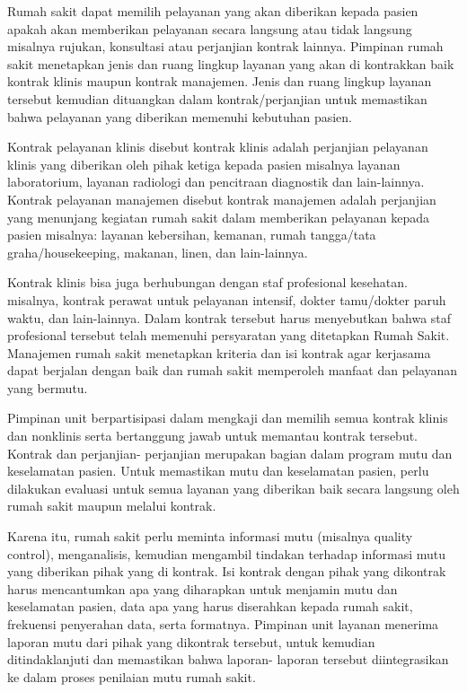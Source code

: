 \documentclass[
]{book}
\begin{document}
Rumah sakit dapat memilih pelayanan yang akan diberikan kepada pasien apakah akan memberikan pelayanan secara langsung atau tidak langsung misalnya rujukan, konsultasi atau perjanjian kontrak lainnya. Pimpinan rumah sakit menetapkan jenis dan ruang lingkup layanan yang akan di kontrakkan baik kontrak klinis maupun kontrak manajemen. Jenis dan ruang lingkup layanan tersebut kemudian dituangkan dalam kontrak/perjanjian untuk memastikan bahwa pelayanan yang diberikan memenuhi kebutuhan pasien.

Kontrak pelayanan klinis disebut kontrak klinis adalah perjanjian pelayanan klinis yang diberikan oleh pihak ketiga kepada pasien misalnya layanan laboratorium, layanan radiologi dan pencitraan diagnostik dan lain-lainnya. Kontrak pelayanan manajemen disebut kontrak manajemen adalah perjanjian yang menunjang kegiatan rumah sakit dalam memberikan pelayanan kepada pasien misalnya: layanan kebersihan, kemanan, rumah tangga/tata graha/housekeeping, makanan, linen, dan lain-lainnya.

Kontrak klinis bisa juga berhubungan dengan staf profesional kesehatan. misalnya, kontrak perawat untuk pelayanan intensif, dokter tamu/dokter paruh waktu, dan lain-lainnya. Dalam kontrak tersebut harus menyebutkan bahwa staf profesional tersebut telah memenuhi persyaratan yang ditetapkan Rumah Sakit. Manajemen rumah sakit menetapkan kriteria dan isi kontrak agar kerjasama dapat berjalan dengan baik dan rumah sakit memperoleh manfaat dan pelayanan yang bermutu.

Pimpinan unit berpartisipasi dalam mengkaji dan memilih semua kontrak klinis dan nonklinis serta bertanggung jawab untuk memantau kontrak tersebut.
Kontrak dan perjanjian- perjanjian merupakan bagian dalam program mutu dan keselamatan pasien. Untuk memastikan mutu dan keselamatan pasien, perlu dilakukan evaluasi untuk semua layanan yang diberikan baik secara langsung oleh rumah sakit
maupun melalui kontrak.

Karena itu, rumah sakit perlu meminta informasi mutu (misalnya quality control), menganalisis, kemudian mengambil tindakan terhadap informasi mutu yang diberikan pihak yang di kontrak. Isi kontrak dengan pihak yang dikontrak harus mencantumkan apa yang diharapkan untuk menjamin mutu dan keselamatan pasien, data apa yang harus diserahkan kepada rumah sakit, frekuensi penyerahan data, serta formatnya. Pimpinan unit layanan menerima laporan mutu dari pihak yang dikontrak tersebut, untuk kemudian ditindaklanjuti dan memastikan bahwa laporan- laporan tersebut diintegrasikan ke dalam proses penilaian mutu rumah sakit.
\end{document}
